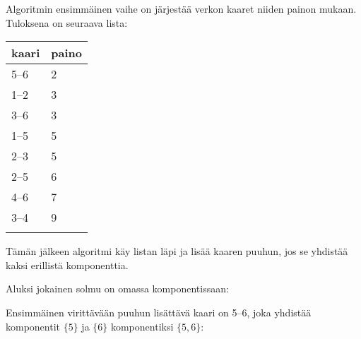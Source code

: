 \begin{samepage}
Algoritmin ensimmäinen vaihe on
järjestää verkon kaaret niiden painon mukaan.
Tuloksena on seuraava lista:

\begin{tabular}{ll}
\\
kaari & paino \\
\hline
5--6 & 2 \\
1--2 & 3 \\
3--6 & 3 \\
1--5 & 5 \\
2--3 & 5 \\
2--5 & 6 \\
4--6 & 7 \\
3--4 & 9 \\
\\
\end{tabular}
\end{samepage}

Tämän jälkeen algoritmi käy listan läpi
ja lisää kaaren puuhun,
jos se yhdistää kaksi erillistä komponenttia.

Aluksi jokainen solmu on omassa komponentissaan:

\begin{center}
\end{center}
Ensimmäinen virittävään puuhun lisättävä
kaari on 5--6, joka yhdistää
komponentit $\{5\}$ ja $\{6\}$ komponentiksi $\{5,6\}$:

